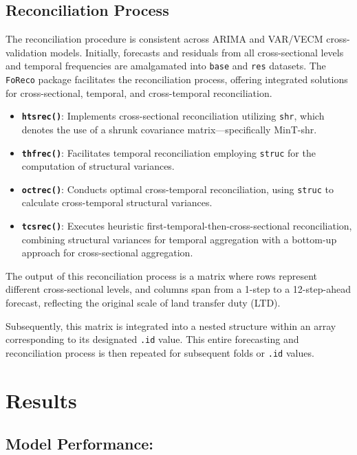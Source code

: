 \documentclass[11pt,a4paper,]{article}
\providecommand{\tightlist}{%
  \setlength{\itemsep}{0pt}\setlength{\parskip}{0pt}}
\begin{document}
\subsection{Reconciliation Process}\label{reconciliation-process}

The reconciliation procedure is consistent across ARIMA and VAR/VECM cross-validation models. Initially, forecasts and residuals from all cross-sectional levels and temporal frequencies are amalgamated into \texttt{base} and \texttt{res} datasets. The \texttt{FoReco} package facilitates the reconciliation process, offering integrated solutions for cross-sectional, temporal, and cross-temporal reconciliation.

\begin{itemize}
\tightlist
\item
  \textbf{\texttt{htsrec()}}: Implements cross-sectional reconciliation utilizing \texttt{shr}, which denotes the use of a shrunk covariance matrix---specifically MinT-shr.
\item
  \textbf{\texttt{thfrec()}}: Facilitates temporal reconciliation employing \texttt{struc} for the computation of structural variances.
\item
  \textbf{\texttt{octrec()}}: Conducts optimal cross-temporal reconciliation, using \texttt{struc} to calculate cross-temporal structural variances.
\item
  \textbf{\texttt{tcsrec()}}: Executes heuristic first-temporal-then-cross-sectional reconciliation, combining structural variances for temporal aggregation with a bottom-up approach for cross-sectional aggregation.
\end{itemize}

The output of this reconciliation process is a matrix where rows represent different cross-sectional levels, and columns span from a 1-step to a 12-step-ahead forecast, reflecting the original scale of land transfer duty (LTD).

Subsequently, this matrix is integrated into a nested structure within an array corresponding to its designated \texttt{.id} value. This entire forecasting and reconciliation process is then repeated for subsequent folds or \texttt{.id} values.

\section{Results}\label{results}

\subsection{Model Performance:}\label{model-performance}
\end{document}
